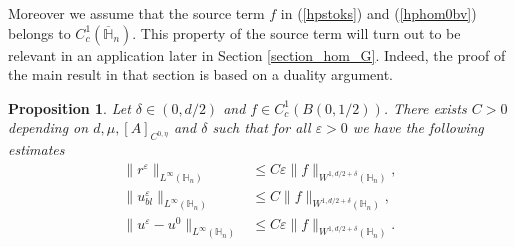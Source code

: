 \documentclass[11pt, reqno]{amsart}
\newtheorem{proposition}[theorem]{Proposition}
\theoremstyle{definition}
\theoremstyle{remark}
\numberwithin{equation}{section}
\begin{document}
	\noindent Moreover we assume that the source term $f$ in (\ref{hpstoks}) and (\ref{hphom0bv}) belongs to $C_c^1 (\overline{\mathbb{H}}_n)$. This property of the source term will turn out to be relevant in an application later in Section  \ref{section_hom_G}. Indeed, the proof of the main result in that section is based on a duality argument. 

	
	\begin{proposition}\label{propolinfestim}
		Let $\delta\in(0,d/2)$ and $f\in C^1_c(B(0,1/2))$.	There exists $C>0$ depending  on $d,\mu,[A]_{C^{0,\eta}}$ and $\delta$
		such that for all $\varepsilon>0$ we have the following estimates 
		\begin{align}
			\| r^\varepsilon \|_{L^\infty(\mathbb{H}_n)}&\leq C\varepsilon\| f\|_{W^{1,d/2+\delta }(\mathbb{H}_n)},\nonumber\\
			\| u^\varepsilon_{bl}\|_{L^\infty(\mathbb{H}_n)}&\leq C\| f\|_{W^{1,d/2+ \delta }(\mathbb{H}_n)},\nonumber\\
			\| u^\varepsilon - u^0 \|_{L^\infty(\mathbb{H}_n)}&\leq C\varepsilon\| f \|_{W^{1,d/2+\delta }(\mathbb{H}_n)}. \label{estimL8uepsu0}  
		\end{align}
	\end{proposition}
	
\end{document}
